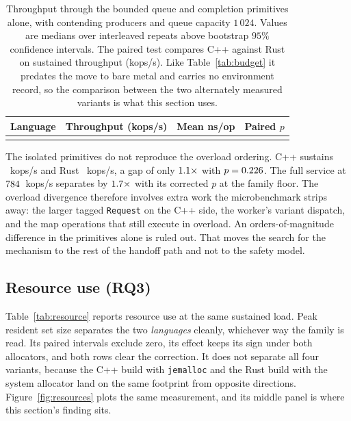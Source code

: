 \documentclass[english,oneside,a4paper,censored,csm,software-track-2020]{HYthesisML}
\begin{document}
\begin{table}[tp]
\centering
\small
\caption[Throughput through the contended synchronisation primitives alone]{Throughput through
the bounded queue and completion primitives alone, with \ContentionProducers{} contending producers
and queue capacity $1\,024$. Values are medians over \ContentionRepeats{} interleaved repeats above
bootstrap $95\%$ confidence intervals. The paired test compares C++ against Rust on sustained
throughput (kops/s). Like Table~\ref{tab:budget} it predates the move to bare metal and carries no
environment record, so the comparison between the two alternately measured variants is what this section
uses.\label{tab:contention}}
\begin{tabular}{@{}l r r r@{}}
\hline\hline
Language & Throughput (kops/s) & Mean ns/op & Paired $p$ \\
\hline
\\
\hline
\end{tabular}
\end{table}

The isolated primitives do not reproduce the overload ordering. C++ sustains
\ContentionThrCpp{}~kops/s and Rust \ContentionThrRust{}~kops/s, a gap of only
$1.1\times$ with $p = 0.226$. The full service at $784$~kops/s
separates by $1.7\times$ with its corrected $p$ at the family floor. The overload
divergence therefore involves extra work the microbenchmark strips away: the larger tagged
\texttt{Request} on the C++ side, the worker's variant dispatch, and the map operations that
still execute in overload. An orders-of-magnitude difference in the primitives alone is ruled
out. That moves the search for the mechanism to the rest of the handoff path and not to the
safety model.

\subsection{Resource use (RQ3)}\label{sec:resources}
Table~\ref{tab:resource} reports resource use at the same sustained load. Peak resident set size
separates the two \emph{languages} cleanly, whichever way the family is read. Its paired intervals
exclude zero, its effect keeps its sign under both allocators, and both rows clear the
correction. It does not separate all four variants, because the C++ build with \texttt{jemalloc}
and the Rust build with the system allocator land on the same footprint from opposite directions.
Figure~\ref{fig:resources} plots the same measurement, and its middle panel is where this
section's finding sits.
\end{document}
